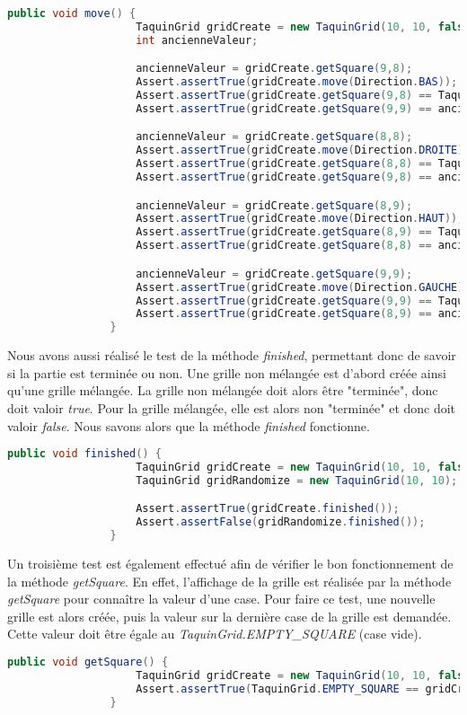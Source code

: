 			\begin{lstlisting}[gobble=12, caption=Test Moved(), language=java, label=TestMoved]
				public void move() {
					TaquinGrid gridCreate = new TaquinGrid(10, 10, false);
					int ancienneValeur;

					ancienneValeur = gridCreate.getSquare(9,8);
					Assert.assertTrue(gridCreate.move(Direction.BAS));
					Assert.assertTrue(gridCreate.getSquare(9,8) == TaquinGrid.EMPTY_SQUARE);
					Assert.assertTrue(gridCreate.getSquare(9,9) == ancienneValeur);

					ancienneValeur = gridCreate.getSquare(8,8);
					Assert.assertTrue(gridCreate.move(Direction.DROITE));
					Assert.assertTrue(gridCreate.getSquare(8,8) == TaquinGrid.EMPTY_SQUARE);
					Assert.assertTrue(gridCreate.getSquare(9,8) == ancienneValeur);

					ancienneValeur = gridCreate.getSquare(8,9);
					Assert.assertTrue(gridCreate.move(Direction.HAUT));
					Assert.assertTrue(gridCreate.getSquare(8,9) == TaquinGrid.EMPTY_SQUARE);
					Assert.assertTrue(gridCreate.getSquare(8,8) == ancienneValeur);

					ancienneValeur = gridCreate.getSquare(9,9);
					Assert.assertTrue(gridCreate.move(Direction.GAUCHE));
					Assert.assertTrue(gridCreate.getSquare(9,9) == TaquinGrid.EMPTY_SQUARE);
					Assert.assertTrue(gridCreate.getSquare(8,9) == ancienneValeur);
				}
			\end{lstlisting}

			Nous avons aussi réalisé le test de la méthode \textit{finished}, permettant donc de savoir si la partie est terminée ou non. Une grille non mélangée est d'abord créée ainsi qu'une grille mélangée. La grille non mélangée doit alors être "terminée", donc doit valoir \textit{true}. Pour la grille mélangée, elle est alors non "terminée" et donc doit valoir \textit{false}. Nous savons alors que la méthode \textit{finished} fonctionne.

			\begin{lstlisting}[gobble=12, language=java, caption=Teste de la méthode finished()]
				public void finished() {
					TaquinGrid gridCreate = new TaquinGrid(10, 10, false);
					TaquinGrid gridRandomize = new TaquinGrid(10, 10);

					Assert.assertTrue(gridCreate.finished());
					Assert.assertFalse(gridRandomize.finished());
				}
			\end{lstlisting}

			Un troisième test est également effectué afin de vérifier le bon fonctionnement de la méthode \textit{getSquare}. En effet, l'affichage de la grille est réalisée par la méthode \textit{getSquare} pour connaître la valeur d'une case. Pour faire ce test, une nouvelle grille est alors créée, puis la valeur sur la dernière case de la grille est demandée. Cette valeur doit être égale au \textit{TaquinGrid.EMPTY\_SQUARE} (case vide).

			\begin{lstlisting}[gobble=12, language=java, caption=Teste getSquare()]
				public void getSquare() {
					TaquinGrid gridCreate = new TaquinGrid(10, 10, false);
					Assert.assertTrue(TaquinGrid.EMPTY_SQUARE == gridCreate.getSquare(9, 9));
				}
			\end{lstlisting}
